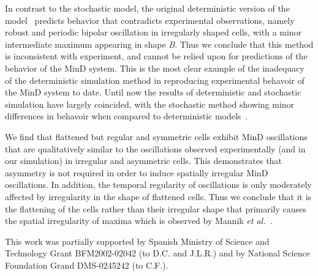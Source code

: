 \documentclass{pnastwo}
\begin{document}
\begin{article}
%

In contrast to the stochastic model, the original deterministic
version of the model~\cite{huang2003dynamic} predicts behavior that
contradicts experimental observations, namely robust and periodic
bipolar oscillation in irregularly shaped cells, with a minor
intermediate maximum appearing in shape \emph{B}.  Thus we conclude
that this method is inconsistent with experiment, and cannot be relied
upon for predictions of the behavior of the MinD system.  This is the
most clear example of the inadequacy of the deterministic simulation
method in reproducing experimental behavoir of the MinD system to
date.  Until now the results of deterministic and stochastic
simulation have largely coincided, with the stochastic method showing
minor differences in behavoir when compared to deterministic
models~\cite{kerr2006division, fange2006noise, huang2004min,
  kruse2007experimentalist}.

We find that flattened but regular and symmetric cells exhibit MinD
oscillations that are qualitatively similar to the oscillations
observed experimentally (and in our simulation) in irregular and
asymmetric cells.  This demonstrates that asymmetry is not required in
order to induce spatially irregular MinD oscillations.  In addition,
the temporal regularity of oscillations is only moderately affected by
irregularity in the shape of flattened cells.  Thus we conclude
that it is the flattening of the cells rather than their irregular
shape that primarily causes the spatial irregularity of maxima which
is observed by Mannik \emph{et al.}~\cite{mannik2012robustness}.



\end{article}

\begin{acknowledgments}
This work was partially supported by
Spanish Ministry of Science and Technology Grant BFM2002-02042 (to D.C. and
J.L.R.) and by National Science Foundation Grand DMS-0245242 (to C.F.).
\end{acknowledgments}
\end{document}
